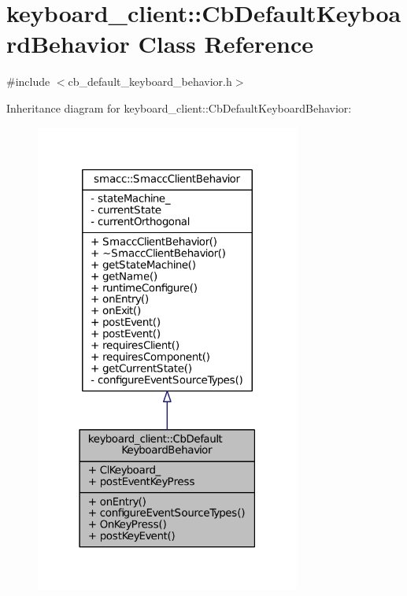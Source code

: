 \hypertarget{classkeyboard__client_1_1CbDefaultKeyboardBehavior}{}\section{keyboard\+\_\+client\+:\+:Cb\+Default\+Keyboard\+Behavior Class Reference}
\label{classkeyboard__client_1_1CbDefaultKeyboardBehavior}


{\ttfamily \#include $<$cb\+\_\+default\+\_\+keyboard\+\_\+behavior.\+h$>$}



Inheritance diagram for keyboard\+\_\+client\+:\+:Cb\+Default\+Keyboard\+Behavior\+:
\nopagebreak
\begin{figure}[H]
\begin{center}
\leavevmode
\includegraphics[width=247pt]{classkeyboard__client_1_1CbDefaultKeyboardBehavior__inherit__graph}
\end{center}
\end{figure}



